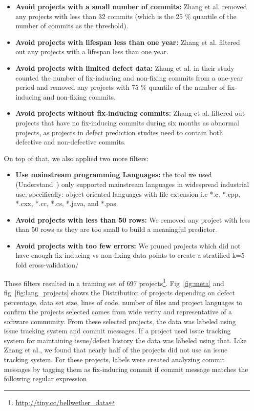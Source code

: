 \documentclass[10pt,journal,compsoc]{IEEEtran}
\newcommand{\bi}{\begin{itemize}}
\newcommand{\ei}{\end{itemize}}
\begin{document}
\bi
  \item \textbf{Avoid projects with a small number of commits:} Zhang et al. removed any projects with less than 32 commits (which is the 25 \% quantile of the number of commits as the threshold). 
 
    
    \item \textbf{Avoid projects with lifespan less than one year:} Zhang et al. filtered out any  projects with a lifespan less than one year.  
    
    \item \textbf{Avoid projects with limited defect data:} Zhang et al. in their study counted the number of fix-inducing and non-fixing commits from a one-year period and removed any projects with 75 \% quantile of the number of fix-inducing and non-fixing commits.  
    
    \item \textbf{Avoid projects without fix-inducing commits:} Zhang et al. filtered out projects that have no fix-inducing commits during six months as abnormal projects, as projects in defect prediction studies need to contain both defective and non-defective commits.
\ei
On top of that, we also applied two more filters:
\bi
    \item \textbf{Use mainstream programming Languages:} the tool
    we used (Understand~\cite{visualize}) only supported     mainstream languages in widespread
    industrial use; specifically: object-oriented languages with file extension i.e *.c, *.cpp, *.cxx, *.cc, *.cs, *.java, and *.pas.
    
    \item \textbf{Avoid projects with less than 50 rows:} We removed any project with less than 50 rows as they are too small to build a meaningful predictor. 
       \item \textbf{Avoid projects with too few errors:}
    We pruned  projects which did not  have enough fix-inducing vs non-fixing data points to create a stratified k=5 fold cross-validation/%
    
\ei
These filters resulted in a training set of   697 projects\footnote{\href{http://tiny.cc/bellwether_data}{http://tiny.cc/bellwether\_data}}. Fig~\ref{fig:meta} and fig~\ref{fig:lang_projects} shows the Distribution of projects depending on defect percentage, data set size, lines of code, number of files and project languages to confirm the projects selected comes from wide verity and representative of a software community. 
From these selected projects, the data was labeled using issue tracking system and commit messages. If a project used issue tracking system for maintaining issue/defect history the data was labeled using that. Like  Zhang et al., we found that nearly half  of the projects did not use an issue tracking system. For these projects, labels were created analyzing commit messages by tagging them as fix-inducing commit if commit message matches the following regular expression
\end{document}
